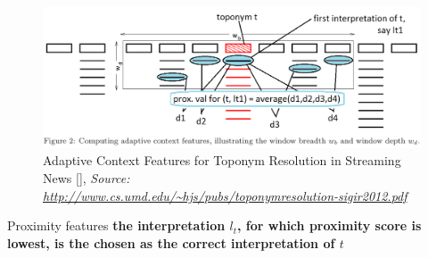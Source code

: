 \documentclass{beamer}
\begin{document}
{\begin{overprint}
		\begin{figure}
			\includegraphics[width=\textwidth]{adaptive-proximity-k2.png} 
			\caption{Adaptive Context Features for Toponym Resolution in Streaming News [], \textit{Source: \url{http://www.cs.umd.edu/~hjs/pubs/toponymresolution-sigir2012.pdf}}}
		\end{figure}
				
		\vspace*{-5cm}
		\begin{block}{\centering Proximity features}
			\centering  \textbf{the interpretation $l_t$, for which proximity score is lowest, is the chosen as the correct interpretation of $t$}
		\end{block}
		
	\end{overprint}
} %
%	
%
%
%
%	

\end{document}
